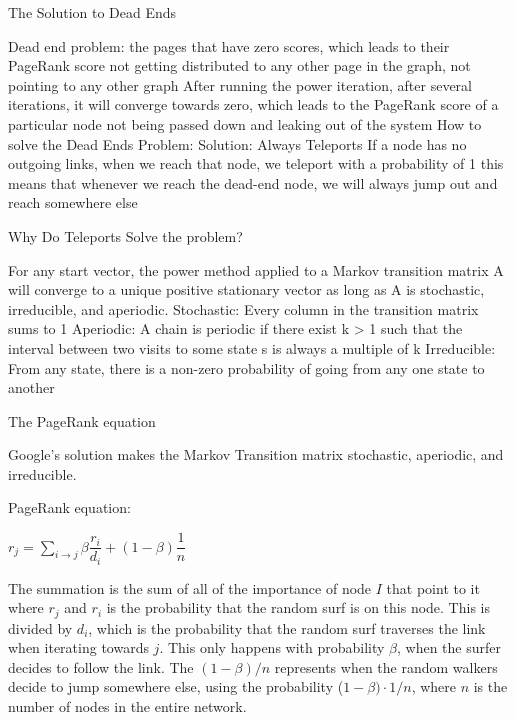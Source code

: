 \documentclass{beamer}
\begin{document}
\begin{frame}[t]{The Solution to Dead Ends}
\begin{outline}
\1 Dead end problem: the pages that have zero scores, which leads to their PageRank score not getting distributed to any other page in the graph, not pointing to any other graph
\1 After running the power iteration, after several iterations, it will converge towards zero, which leads to the PageRank score of a particular node not being passed down and leaking out of the system
\1 How to solve the Dead Ends Problem:
        \2 Solution: Always Teleports
        \2 If a node has no outgoing links, when we reach that node, we teleport with a probability of 1
        \2 this means that whenever we reach the dead-end node, we will always jump out and reach somewhere else
\end{outline}
\end{frame}
    
\begin{frame}[t]{Why Do Teleports Solve the problem?}
\begin{outline}
\1 For any start vector, the power method applied to a Markov transition matrix A will converge to a unique positive stationary vector as long as A is stochastic, irreducible, and aperiodic.
    \2 Stochastic: Every column in the transition matrix sums to 1
    \2 Aperiodic: A chain is periodic if there exist k > 1 such that the interval between two visits to some state s is always a multiple of k
    \2 Irreducible: From any state, there is a non-zero probability of going from any one state to another
\end{outline}
\end{frame}
    
\begin{frame}[t]{The PageRank equation}
\begin{outline}
\1 Google's solution makes the Markov Transition matrix stochastic, aperiodic, and irreducible.

\1 PageRank equation:

\begin{mdframed}[backgroundcolor=blue!20]
    \begin{center}
        $r_j = \sum\limits_{i\to j}\beta \dfrac{r_i}{d_i} + (1-\beta)\dfrac{1}{n}$
    \end{center}
\end{mdframed}

\2 The summation is the sum of all of the importance of node $I$ that point to it where $r_j$ and $r_i$ is the probability that the random surf is on this node.
\2 This is divided by $d_i$, which is the probability that the random surf traverses the link when iterating towards $j$. This only happens with probability $\beta$, when the surfer decides to follow the link.
\2 The $(1-\beta)/n$ represents when the random walkers decide to jump somewhere else, using the probability ($1-\beta) \cdot 1/n$, where $n$ is the number of nodes in the entire network.
\end{outline}
\end{frame}
\end{document}
